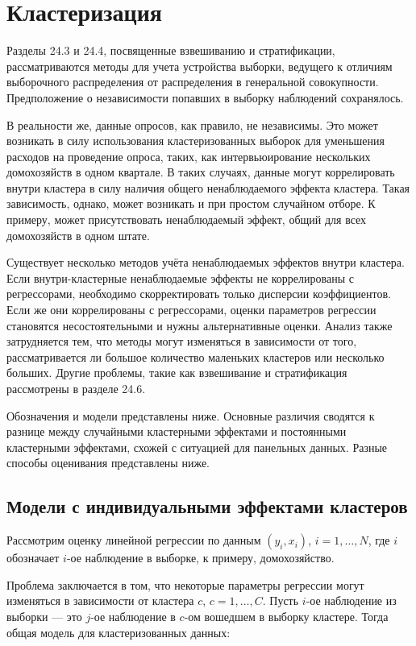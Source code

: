 \section{Кластеризация}

Разделы 24.3 и 24.4, посвященные взвешиванию и стратификации, рассматриваются методы для учета устройства выборки, ведущего к отличиям выборочного распределения от распределения в генеральной совокупности. Предположение о независимости попавших в выборку наблюдений сохранялось. 

В реальности же, данные опросов, как правило, не независимы. Это может возникать в силу использования кластеризованных выборок для уменьшения расходов на проведение опроса, таких, как интервьюирование нескольких домохозяйств в одном квартале. В таких случаях, данные могут коррелировать внутри кластера в силу наличия общего ненаблюдаемого эффекта кластера. Такая зависимость, однако, может возникать и при простом случайном отборе. К примеру, может присутствовать ненаблюдаемый эффект, общий для всех домохозяйств в одном штате. 

Существует несколько методов учёта ненаблюдаемых эффектов внутри кластера. Если внутри-кластерные ненаблюдаемые эффекты не коррелированы с регрессорами, необходимо скорректировать только дисперсии коэффициентов. Если же они коррелированы с регрессорами, оценки параметров регрессии становятся несостоятельными и нужны альтернативные оценки. Анализ также затрудняется тем, что методы могут изменяться в зависимости от того, рассматривается ли большое количество маленьких кластеров или несколько больших. Другие проблемы, такие как взвешивание и стратификация рассмотрены в разделе 24.6. 

Обозначения и модели представлены ниже. Основные различия сводятся к разнице между случайными кластерными эффектами и постоянными кластерными эффектами, схожей с ситуацией для панельных данных. Разные способы оценивания представлены ниже. 

\subsection{Модели с индивидуальными эффектами кластеров}

Рассмотрим оценку линейной регрессии по данным $(y_i,x_i)$, $i = 1, \dots, N$, где $i$ обозначает $i$-ое наблюдение в выборке, к примеру, домохозяйство. 

Проблема заключается в том, что некоторые параметры регрессии могут изменяться в зависимости от кластера $c$, $c = 1, \dots, C$. Пусть $i$-ое наблюдение из выборки --- это $j$-ое наблюдение в $c$-ом вошедшем в выборку кластере. Тогда общая модель для кластеризованных данных:

